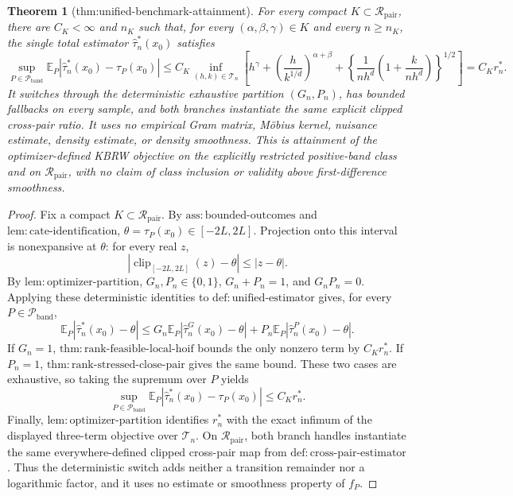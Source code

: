 \documentclass{article}
\newtheorem{theorem}{Theorem}
\begin{document}
\begin{theorem}[thm:unified-benchmark-attainment]\label{thm:unified-benchmark-attainment}
For every compact \(K\subset\mathcal R_{\mathrm{pair}}\), there are \(C_K<\infty\) and \(n_K\) such that, for every \((\alpha,\beta,\gamma)\in K\) and every \(n\geq n_K\), the single total estimator \(\widehat\tau_n^*(x_0)\) satisfies
\[
 \sup_{P\in\mathcal P_{\mathrm{band}}}\mathbb E_P\left|\widehat\tau_n^*(x_0)-\tau_P(x_0)\right|
 \leq C_K\inf_{(h,k)\in\mathcal T_n}\left[h^\gamma+
 \left(\frac{h}{k^{1/d}}\right)^{\alpha+\beta}+
 \left\{\frac1{nh^d}\left(1+\frac{k}{nh^d}\right)\right\}^{1/2}\right]
 =C_Kr_n^*.
\]
It switches through the deterministic exhaustive partition \((G_n,P_n)\), has bounded fallbacks on every sample, and both branches instantiate the same explicit clipped cross-pair ratio.  It uses no empirical Gram matrix, M\"obius kernel, nuisance estimate, density estimate, or density smoothness.  This is attainment of the optimizer-defined KBRW objective on the explicitly restricted positive-band class and on \(\mathcal R_{\mathrm{pair}}\), with no claim of class inclusion or validity above first-difference smoothness.
\end{theorem}
\begin{proof}
Fix a compact \(K\subset\mathcal R_{\mathrm{pair}}\).  By \(\mathrm{ass:bounded\mbox{-}outcomes}\) and \(\mathrm{lem:cate\mbox{-}identification}\), \(\theta=\tau_P(x_0)\in[-2L,2L]\).  Projection onto this interval is nonexpansive at \(\theta\): for every real \(z\),
\[
 |\operatorname{clip}_{[-2L,2L]}(z)-\theta|\leq|z-\theta|.
\]
By \(\mathrm{lem:optimizer\mbox{-}partition}\), \(G_n,P_n\in\{0,1\}\), \(G_n+P_n=1\), and \(G_nP_n=0\).  Applying these deterministic identities to \(\mathrm{def:unified\mbox{-}estimator}\) gives, for every \(P\in\mathcal P_{\mathrm{band}}\),
\[
 \mathbb E_P|\widehat\tau_n^*(x_0)-\theta|
 \leq G_n\mathbb E_P|\widehat\tau_n^G(x_0)-\theta|
 +P_n\mathbb E_P|\widehat\tau_n^P(x_0)-\theta|.
\]
If \(G_n=1\), \(\mathrm{thm:rank\mbox{-}feasible\mbox{-}local\mbox{-}hoif}\) bounds the only nonzero term by \(C_Kr_n^*\).  If \(P_n=1\), \(\mathrm{thm:rank\mbox{-}stressed\mbox{-}close\mbox{-}pair}\) gives the same bound.  These two cases are exhaustive, so taking the supremum over \(P\) yields
\[
 \sup_{P\in\mathcal P_{\mathrm{band}}}
 \mathbb E_P|\widehat\tau_n^*(x_0)-\tau_P(x_0)|\leq C_Kr_n^*.
\]
Finally, \(\mathrm{lem:optimizer\mbox{-}partition}\) identifies \(r_n^*\) with the exact infimum of the displayed three-term objective over \(\mathcal T_n\).  On \(\mathcal R_{\mathrm{pair}}\), both branch handles instantiate the same everywhere-defined clipped cross-pair map from \(\mathrm{def:cross\mbox{-}pair\mbox{-}estimator}\).  Thus the deterministic switch adds neither a transition remainder nor a logarithmic factor, and it uses no estimate or smoothness property of \(f_P\).
\end{proof}
\end{document}
